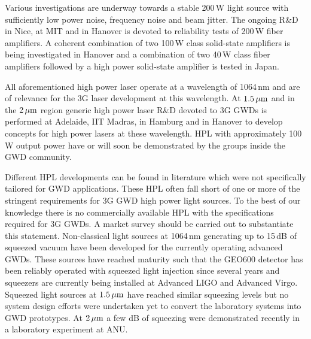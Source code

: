 Various investigations are underway towards a stable 200\,W light source with sufficiently low power noise, frequency noise and beam jitter. 
The ongoing R\&D in Nice, at MIT and in Hanover is devoted to reliability tests of 200\,W fiber amplifiers. A coherent combination of two 100\,W class solid-state amplifiers is being investigated in Hanover and a combination of two 40\,W class fiber amplifiers followed by a high power solid-state amplifier is tested in Japan.

All aforementioned high power laser operate at a wavelength of 1064\,nm and are of relevance for the 3G laser development at this wavelength.
\newpage %
At $ 1.5\, {\rm \mu m}$ and in the $ 2\, {\rm \mu m}$ region generic high power laser R\&D devoted to 3G GWDs is performed at Adelaide, IIT Madras, in Hamburg and in Hanover to develop concepts for high power lasers at these wavelength. HPL with approximately 100\,W output power have or will soon be demonstrated by the groups inside the GWD community. 

Different HPL developments can be found in literature which were not specifically tailored for GWD applications. These HPL often fall short of one or more of the stringent requirements for 3G GWD high power light sources. To the best of our knowledge there is no commercially available HPL with the specifications required for 3G GWDs. A market survey should be carried out to substantiate this statement.
Non-classical light sources at 1064\,nm generating up to 15\,dB of squeezed vacuum have been developed for the currently operating advanced GWDs. These sources have reached maturity such that the GEO600 detector has been reliably operated with squeezed light injection since several years and squeezers are currently being installed at Advanced LIGO and Advanced Virgo.
Squeezed light sources at $ 1.5\, {\rm \mu m}$ have reached similar squeezing levels but no system design efforts were undertaken yet to convert the laboratory systems into GWD prototypes.
At $ 2\, {\rm \mu m}$ a few dB of squeezing were demonstrated recently in a laboratory experiment at ANU.


